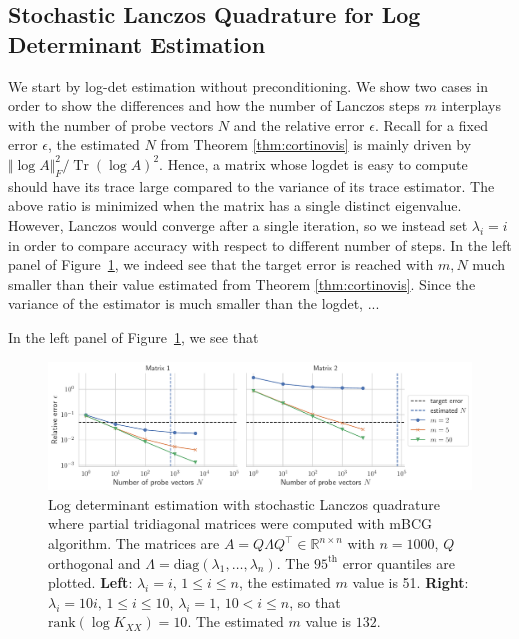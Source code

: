 \documentclass{article}
\newcommand{\R}{\mathbb R}
\newcommand{\norm}[1]{\Vert #1 \Vert}
\DeclareMathOperator{\trace}{Tr}
\begin{document}
\subsection{Stochastic Lanczos Quadrature for Log Determinant Estimation}

We start by log-det estimation without preconditioning. We show two cases in order to show the differences and how the number of Lanczos steps $m$ interplays with the number of probe vectors $N$ and the relative error $\epsilon$. Recall for a fixed error $\epsilon$, the estimated $N$ from Theorem \ref{thm:cortinovis} is mainly driven by $\norm{\log A}_F^2 / \trace(\log A)^2$. Hence, a matrix whose logdet is easy to compute should have its trace large compared to the variance of its trace estimator. The above ratio is minimized when the matrix has a single distinct eigenvalue. However, Lanczos would converge after a single iteration, so we instead set $\lambda_i = i$ in order to compare accuracy with respect to different number of steps. In the left panel of Figure~\ref{fig:logdet_mbcg}, we indeed see that the target error is reached with $m, N$ much smaller than their value estimated from Theorem \ref{thm:cortinovis}. Since the variance of the estimator is much smaller than the logdet, ...

In the left panel of Figure~\ref{fig:logdet_mbcg}, we see that 

\begin{figure}
    \centering
    \includegraphics[width=\textwidth]{res/logdet_mbcg.pdf}
    \caption{Log determinant estimation with stochastic Lanczos quadrature where partial tridiagonal matrices were computed with mBCG algorithm. The matrices are $A = Q \Lambda Q^\top \in \R^{n \times n}$ with $n=1000$, $Q$ orthogonal and $\Lambda = \text{diag}(\lambda_1, \ldots, \lambda_n)$. The $95^\text{th}$ error quantiles are plotted. \textbf{Left}: $\lambda_i = i, \, 1 \le i \le n$, the estimated $m$ value is 51. \textbf{Right}: $\lambda_i = 10i, \, 1 \le i \le 10$, $\lambda_i = 1, \, 10 < i \le n$, so that $\text{rank}(\log K_{XX}) = 10$. The estimated $m$ value is $132$.}
    \label{fig:logdet_mbcg}
\end{figure}
\end{document}
